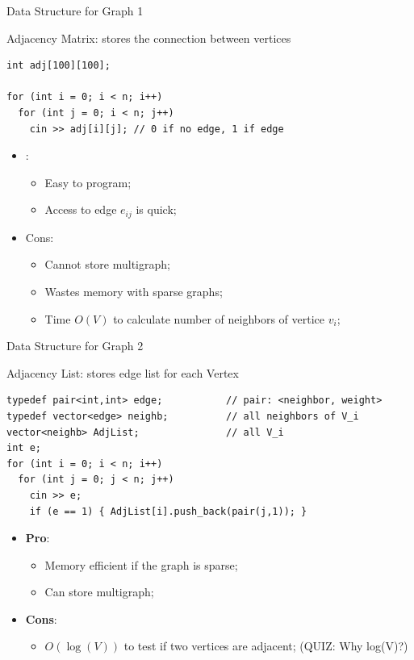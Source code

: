 \begin{frame}[fragile]{Data Structure for Graph 1}

\begin{block}{Adjacency Matrix: stores the connection between vertices}
\begin{verbatim}
int adj[100][100];

for (int i = 0; i < n; i++)
  for (int j = 0; i < n; j++)
    cin >> adj[i][j]; // 0 if no edge, 1 if edge
\end{verbatim}

  \begin{itemize}
    \item {}:
    \begin{itemize}
      \item Easy to program;
      \item Access to edge $e_{ij}$ is quick;
    \end{itemize}
    \item \alert{Cons}:
      \begin{itemize}
      \item Cannot store multigraph;
      \item Wastes memory with sparse graphs;
      \item Time $O(V)$ to calculate number of neighbors of vertice $v_i$;
      \end{itemize}
    \end{itemize}
  \end{block}
\end{frame}

\begin{frame}[fragile]{Data Structure for Graph 2}

  \begin{block}{Adjacency List: stores edge list for each Vertex}
      {\smaller
\begin{verbatim}
typedef pair<int,int> edge;           // pair: <neighbor, weight>
typedef vector<edge> neighb;          // all neighbors of V_i
vector<neighb> AdjList;               // all V_i
int e;
for (int i = 0; i < n; i++)
  for (int j = 0; j < n; j++)
    cin >> e;
    if (e == 1) { AdjList[i].push_back(pair(j,1)); }
\end{verbatim}}

\begin{itemize}
  \item {\bf Pro}:
    \begin{itemize}
      \item Memory efficient if the graph is sparse;
      \item Can store multigraph;
    \end{itemize}
  \item {\bf Cons}:
  \begin{itemize}
    \item $O(\log(V))$ to test if two vertices are adjacent; (QUIZ: Why log(V)?)
  \end{itemize}
\end{itemize}
  \end{block}
\end{frame}

